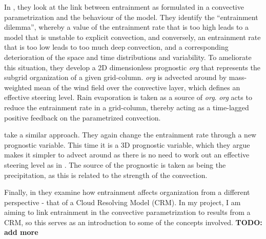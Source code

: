 \documentclass[11pt,a4paper]{article}
\newcommand\todo[1]{\textbf{TODO: #1}}
\begin{document}


In \cite{mapes2011parameterizing}, they look at the link between entrainment as formulated in a convective parametrization and the behaviour of the model. They identify the ``entrainment dilemma'', whereby a value of the entrainment rate that is too high leads to a model that is unstable to explicit convection, and conversely, an entrainment rate that is too low leads to too much deep convection, and a corresponding deterioration of the space and time distributions and variability. To ameliorate this situation, they develop a 2D dimensionless prognostic \textit{org} that represents the subgrid organization of a given grid-column. \textit{org} is advected around by mass-weighted mean of the wind field over the convective layer, which defines an effective steering level. Rain evaporation is taken as a source of \textit{org}. \textit{org} acts to reduce the entrainment rate in a grid-column, thereby acting as a time-lagged positive feedback on the parametrized convection. 

\cite{willett2017simple} take a similar approach. They again change the entrainment rate through a new prognostic variable. This time it is a 3D prognostic variable, which they argue makes it simpler to advect around as there is no need to work out an effective steering level as in \cite{mapes2011parameterizing}. The source of the prognostic is taken as being the precipitation, as this is related to the strength of the convection.

Finally, in \cite{tompkins2017organization} they examine how entrainment affects organization from a different perspective - that of a Cloud Resolving Model (CRM). In my project, I am aiming to link entrainment in the convective parametrization to results from a CRM, so this serves as an introduction to some of the concepts involved. \todo{add more}
\end{document}
